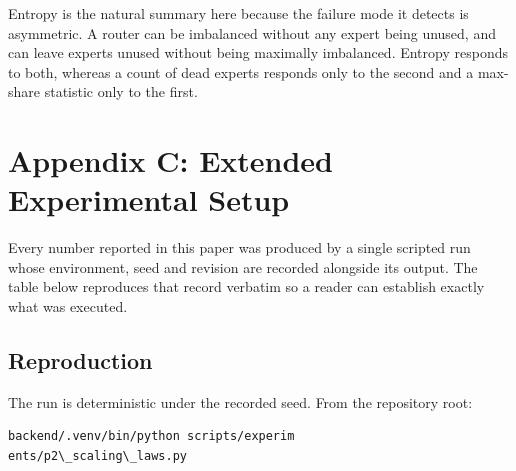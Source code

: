 \documentclass[11pt,a4paper]{article}
\begin{document}
Entropy is the natural summary here because the failure mode it detects is asymmetric. A router can be imbalanced without any expert being unused, and can leave experts unused without being maximally imbalanced. Entropy responds to both, whereas a count of dead experts responds only to the second and a max-share statistic only to the first.




\section{Appendix C: Extended Experimental Setup}


Every number reported in this paper was produced by a single scripted run whose environment, seed and revision are recorded alongside its output. The table below reproduces that record verbatim so a reader can establish exactly what was executed.
\begin{table}[htbp]
\centering
{}
\end{table}


\subsection{Reproduction}


The run is deterministic under the recorded seed. From the repository root:


\begin{scriptsize}
\begin{verbatim}
backend/.venv/bin/python scripts/experim
ents/p2\_scaling\_laws.py
\end{verbatim}
\end{scriptsize}
\end{document}
